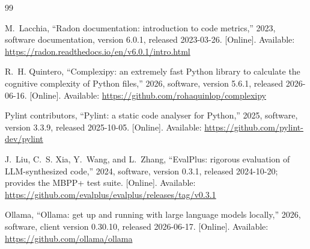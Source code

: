 \renewcommand{\refname}{Tools and Software}
\begin{thebibliography}{99}

\BIBentryALTinterwordspacing
M.~Lacchia, ``Radon documentation: introduction to code metrics,'' 2023,
  software documentation, version 6.0.1, released 2023-03-26. [Online].
  Available: \url{https://radon.readthedocs.io/en/v6.0.1/intro.html}
\BIBentrySTDinterwordspacing

\BIBentryALTinterwordspacing
R.~H. Quintero, ``Complexipy: an extremely fast {Python} library to calculate
  the cognitive complexity of {Python} files,'' 2026, software, version 5.6.1,
  released 2026-06-16. [Online]. Available:
  \url{https://github.com/rohaquinlop/complexipy}
\BIBentrySTDinterwordspacing

\BIBentryALTinterwordspacing
{Pylint contributors}, ``Pylint: a static code analyser for {Python},'' 2025,
  software, version 3.3.9, released 2025-10-05. [Online]. Available:
  \url{https://github.com/pylint-dev/pylint}
\BIBentrySTDinterwordspacing

\BIBentryALTinterwordspacing
J.~Liu, C.~S. Xia, Y.~Wang, and L.~Zhang, ``{EvalPlus}: rigorous evaluation of
  {LLM}-synthesized code,'' 2024, software, version 0.3.1, released 2024-10-20;
  provides the {MBPP+} test suite. [Online]. Available:
  \url{https://github.com/evalplus/evalplus/releases/tag/v0.3.1}
\BIBentrySTDinterwordspacing

\BIBentryALTinterwordspacing
{Ollama}, ``Ollama: get up and running with large language models locally,''
  2026, software, client version 0.30.10, released 2026-06-17. [Online].
  Available: \url{https://github.com/ollama/ollama}
\BIBentrySTDinterwordspacing

\end{thebibliography}
